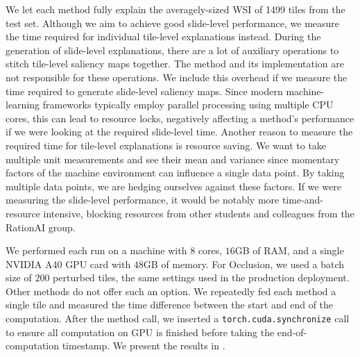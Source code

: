  We let each method fully explain the averagely-sized WSI of 1499 tiles from the test set.
 Although we aim to achieve good slide-level performance, we measure the time required for individual tile-level explanations instead.
 During the generation of slide-level explanations, there are a lot of auxiliary operations to stitch tile-level saliency maps together.
 The method and its implementation are not responsible for these operations.
 We include this overhead if we measure the time required to generate slide-level saliency maps.
 Since modern machine-learning frameworks typically employ parallel processing using multiple CPU cores, this can lead to resource locks, negatively affecting a method's performance if we were looking at the required slide-level time.
 Another reason to measure the required time for tile-level explanations is resource saving.
 We want to take multiple unit measurements and see their mean and variance since momentary factors of the machine environment can influence a single data point. 
 By taking multiple data points, we are hedging ourselves against these factors.
 If we were measuring the slide-level performance, it would be notably more time-and-resource intensive, blocking resources from other students and colleagues from the RationAI group.

 We performed each run on a machine with $8$ cores, $16$GB of RAM, and a single NVIDIA A40 GPU card with $48$GB of memory.
 For Occlusion, we used a batch size of $200$ perturbed tiles, the same settings used in the production deployment.
 Other methods do not offer such an option. We repeatedly fed each method a single tile and measured the time difference between the start and end of the computation.
 After the method call, we inserted a \texttt{torch.cuda.synchronize} call to ensure all computation on GPU is finished before taking the end-of-computation timestamp.
 We present the results in .

